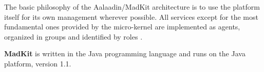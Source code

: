 The basic philosophy of the Aalaadin/MadKit architecture is to use the platform itself for its own management wherever possible.
All services except for the most fundamental ones provided by the micro-kernel are implemented as agents, organized in groups and identified by roles \cite{Ferber98}.

\textbf{MadKit} is written in the Java programming language and runs on the Java platform, version 1.1.